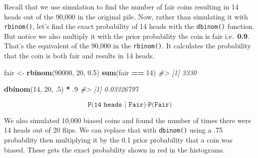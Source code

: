 \documentclass[]{article}
\newenvironment{Shaded}{\begin{snugshade}}{\end{snugshade}}
\newcommand{\CommentTok}[1]{\textcolor[rgb]{0.56,0.35,0.01}{\textit{#1}}}
\newcommand{\DecValTok}[1]{\textcolor[rgb]{0.00,0.00,0.81}{#1}}
\newcommand{\FloatTok}[1]{\textcolor[rgb]{0.00,0.00,0.81}{#1}}
\newcommand{\KeywordTok}[1]{\textcolor[rgb]{0.13,0.29,0.53}{\textbf{#1}}}
\newcommand{\NormalTok}[1]{#1}
\newcommand{\OperatorTok}[1]{\textcolor[rgb]{0.81,0.36,0.00}{\textbf{#1}}}
\newcommand{\StringTok}[1]{\textcolor[rgb]{0.31,0.60,0.02}{#1}}
\begin{document}
Recall that we use simulation to find the number of fair coins resulting
in 14 heads out of the 90,000 in the original pile. Now, rather than
simulating it with \texttt{rbinom()}, let's find the exact probability
of 14 heads with the \texttt{dbinom()} function. But notice we also
multiply it with the prior probability the coin is fair
i.e.~\textbf{0.9}. That's the equivalent of the 90,000 in the
\texttt{rbinom()}. It calculates the probability that the coin is both
fair and results in 14 heads.

\begin{Shaded}
\begin{Highlighting}[]
\NormalTok{fair <-}\StringTok{ }\KeywordTok{rbinom}\NormalTok{(}\DecValTok{90000}\NormalTok{, }\DecValTok{20}\NormalTok{, }\FloatTok{0.5}\NormalTok{)}
\KeywordTok{sum}\NormalTok{(fair }\OperatorTok{==}\StringTok{ }\DecValTok{14}\NormalTok{)}
\CommentTok{#> [1] 3330}
\end{Highlighting}
\end{Shaded}

\begin{Shaded}
\begin{Highlighting}[]
\KeywordTok{dbinom}\NormalTok{(}\DecValTok{14}\NormalTok{, }\DecValTok{20}\NormalTok{, }\FloatTok{.5}\NormalTok{) }\OperatorTok{*}\StringTok{ }\FloatTok{.9}
\CommentTok{#> [1] 0.03326797}
\end{Highlighting}
\end{Shaded}

\[\texttt{P(14 heads | Fair)} \cdot \texttt{P(Fair)}\]

We also simulated 10,000 biased coins and found the number of times
there were 14 heads out of 20 flips. We can replace that with
\texttt{dbinom()} using a .75 probability then multiplying it by the 0.1
prior probability that a coin was biased. These gets the exact
probability shown in red in the histograms.
\end{document}
